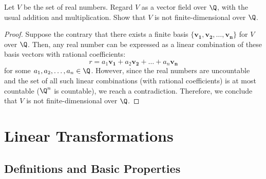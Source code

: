 \documentclass[openany]{book}
\begin{document}
\begin{exercise}
    Let $V$ be the set of real numbers. Regard $V$ as a vector field over $\Q$, with the usual addition and multiplication. Show that $V$ is not finite-dimensional over $\Q$.
\end{exercise}
\begin{proof}
Suppose the contrary that there exists a finite basis $\{ \mathbf{v_1}, \mathbf{v_2}, \ldots, \mathbf{v_n} \}$ for $V$ over $\Q$. Then, any real number can be expressed as a linear combination of these basis vectors with rational coefficients:
$$r = a_1 \mathbf{v_1} + a_2 \mathbf{v_2} + \ldots + a_n \mathbf{v_n}$$
for some $a_1, a_2, \ldots, a_n \in \Q$. However, since the real numbers are uncountable and the set of all such linear combinations (with rational coefficients) is at most countable ($\Q^n$ is countable), we reach a contradiction. Therefore, we conclude that $V$ is not finite-dimensional over $\Q$.
\end{proof}
\chapter{Linear Transformations}
\section{Definitions and Basic Properties}
\end{document}
